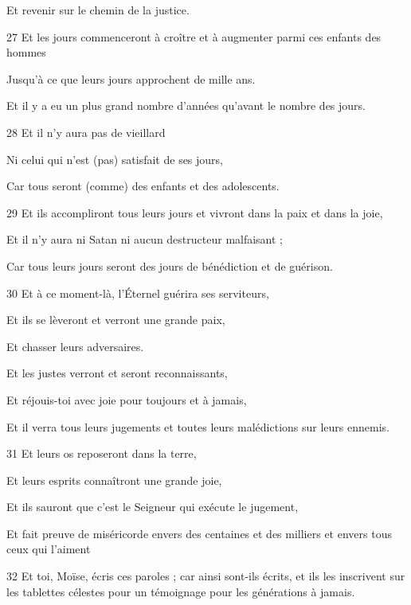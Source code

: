 \par     Et revenir sur le chemin de la justice.
\par    
\par 27 Et les jours commenceront à croître et à augmenter parmi ces enfants des hommes  
\par     Jusqu'à ce que leurs jours approchent de mille ans.  
\par     Et il y a eu un plus grand nombre d'années qu'avant le nombre des jours.
\par    
\par 28 Et il n'y aura pas de vieillard  
\par     Ni celui qui n'est (pas) satisfait de ses jours,  
\par     Car tous seront (comme) des enfants et des adolescents.
\par    
\par 29 Et ils accompliront tous leurs jours et vivront dans la paix et dans la joie,  
\par     Et il n’y aura ni Satan ni aucun destructeur malfaisant ;  
\par     Car tous leurs jours seront des jours de bénédiction et de guérison.
\par    
\par 30 Et à ce moment-là, l'Éternel guérira ses serviteurs,  
\par     Et ils se lèveront et verront une grande paix,  
\par     Et chasser leurs adversaires.
\par    
\par     Et les justes verront et seront reconnaissants,  
\par     Et réjouis-toi avec joie pour toujours et à jamais,  
\par     Et il verra tous leurs jugements et toutes leurs malédictions sur leurs ennemis.
\par    
\par 31 Et leurs os reposeront dans la terre,  
\par     Et leurs esprits connaîtront une grande joie,  
\par     Et ils sauront que c'est le Seigneur qui exécute le jugement,  
\par     Et fait preuve de miséricorde envers des centaines et des milliers et envers tous ceux qui l'aiment
\par    
\par 32 Et toi, Moïse, écris ces paroles ; car ainsi sont-ils écrits, et ils les inscrivent sur les tablettes célestes pour un témoignage pour les générations à jamais.


